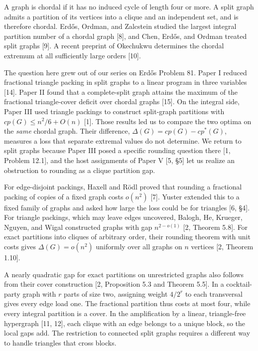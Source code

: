 \documentclass[english,11pt,a4paper]{article}
\begin{document}
A graph is chordal if it has no induced cycle of length four or more. A split graph admits a partition of its vertices into a clique and an independent set, and is therefore chordal. Erdős, Ordman, and Zalcstein studied the largest integral partition number of a chordal graph {[}8{]}, and Chen, Erdős, and Ordman treated split graphs {[}9{]}. A recent preprint of Okechukwu determines the chordal extremum at all sufficiently large orders {[}10{]}.

The question here grew out of our series on Erdős Problem 81. Paper I reduced fractional triangle packing in split graphs to a linear program in three variables {[}14{]}. Paper II found that a complete-split graph attains the maximum of the fractional triangle-cover deficit over chordal graphs {[}15{]}. On the integral side, Paper III used triangle packings to construct split-graph partitions with \(cp(G)\le n^2/6+O(n)\) {[}1{]}. Those results led us to compare the two optima on the \emph{same} chordal graph. Their difference, \(\Delta(G)=cp(G)-cp^*(G)\), measures a loss that separate extremal values do not determine. We return to split graphs because Paper III posed a specific rounding question there {[}1, Problem 12.1{]}, and the host assignments of Paper V {[}5, §5{]} let us realize an obstruction to rounding as a clique partition gap.

For edge-disjoint packings, Haxell and Rödl proved that rounding a fractional packing of copies of a fixed graph costs \(o(n^2)\) {[}7{]}. Yuster extended this to a fixed family of graphs and asked how large the loss could be for triangles {[}6, §4{]}. For triangle packings, which may leave edges uncovered, Balogh, He, Krueger, Nguyen, and Wigal constructed graphs with gap \(n^{2-o(1)}\) {[}2, Theorem 5.8{]}. For exact partitions into cliques of arbitrary order, their rounding theorem with unit costs gives \(\Delta(G)=o(n^2)\) uniformly over all graphs on \(n\) vertices {[}2, Theorem 1.10{]}.

A nearly quadratic gap for exact partitions on unrestricted graphs also follows from their cover construction {[}2, Proposition 5.3 and Theorem 5.5{]}. In a cocktail-party graph with \(r\) parts of size two, assigning weight \(4/2^r\) to each transversal gives every edge load one. The fractional partition thus costs at most four, while every integral partition is a cover. In the amplification by a linear, triangle-free hypergraph {[}11, 12{]}, each clique with an edge belongs to a unique block, so the local gaps add. The restriction to connected split graphs requires a different way to handle triangles that cross blocks.
\end{document}
